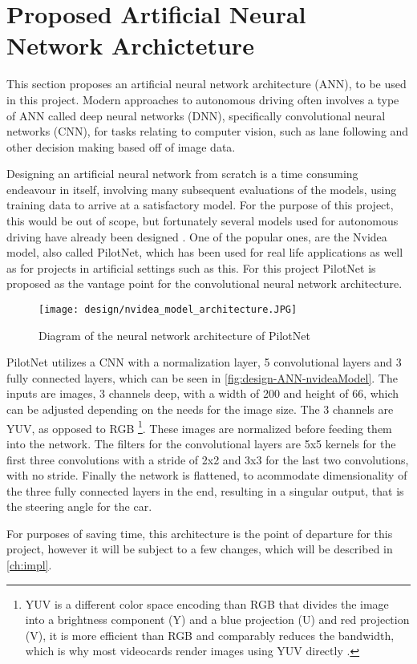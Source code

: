 \section{Proposed Artificial Neural Network Archicteture}\label{sec:design-ANN}
This section proposes an artificial neural network architecture (ANN), to be used in this project. Modern approaches to autonomous driving often involves a type of ANN called deep neural networks (DNN), specifically convolutional neural networks (CNN), for tasks relating to computer vision, such as lane following and other decision making based off of image data. \cite{yang_end--end_2018, patil_convnets_2019, kocic_end--end_2019, bojarski_end--end-nvidea_2016, nain_efficientnet_2019, zhang_yolo--v3_2018}

Designing an artificial neural network from scratch is a time consuming endeavour in itself, involving many subsequent evaluations of the models, using training data to arrive at a satisfactory model. For the purpose of this project, this would be out of scope, but fortunately several models used for autonomous driving have already been designed \cite{bojarski_end--end-nvidea_2016, kocic_end--end_2019, zhang_yolo--v3_2018}. One of the popular ones, are the Nvidea model, also called PilotNet, which has been used for real life applications as well as for projects in artificial settings such as this. For this project PilotNet is proposed as the vantage point for the convolutional neural network architecture.

\begin{figure} [H]
    \centering
    \texttt{[image: design/nvidea\_model\_architecture.JPG]}
    \caption{Diagram of the neural network architecture of PilotNet \cite{bojarski_end--end-nvidea_2016}}
    \label{fig:design-ANN-nvideaModel}
\end{figure}

PilotNet utilizes a CNN with a normalization layer, 5 convolutional layers and 3 fully connected layers, which can be seen in \autoref{fig:design-ANN-nvideaModel}. The inputs are images, 3 channels deep, with a width of 200 and height of 66, which can be adjusted depending on the needs for the image size. The 3 channels are YUV, as opposed to RGB \footnote{YUV is a different color space encoding than RGB that divides the image into a brightness component (Y) and a blue projection (U) and red projection (V), it is more efficient than RGB and comparably reduces the bandwidth, which is why most videocards render images using YUV directly \cite{wikipeadia_yuv_2019, sensorray_rgb--vs--yuv_2019}. }. These images are normalized before feeding them into the network. The filters for the convolutional layers are 5x5 kernels for the first three convolutions with a stride of 2x2 and 3x3 for the last two convolutions, with no stride. Finally the network is flattened, to acommodate dimensionality of the three fully connected layers in the end, resulting in a singular output, that is the steering angle for the car. \cite{bojarski_end--end-nvidea_2016}

For purposes of saving time, this architecture is the point of departure for this project, however it will be subject to a few changes, which will be described in \autoref{ch:impl}. 
